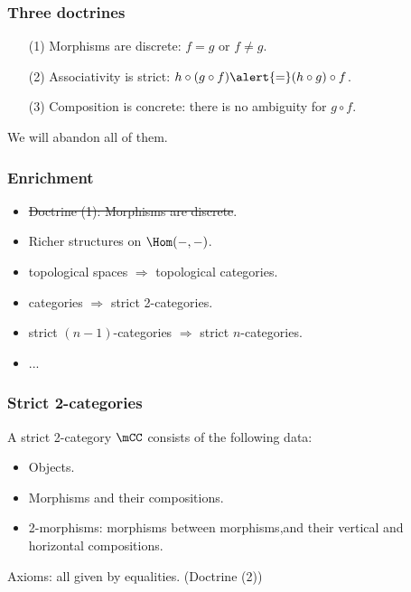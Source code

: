 \begin{frame}
	\frametitle{Three doctrines}

	\begin{itemize}
	\item[(1)]
		Morphisms are \alert{discrete}: $f=g$ or $f\neq g$. \pause
	\item[(2)]
		Associativity is \alert{strict}: $h\circ (g\circ f)\alert{=}(h\circ g) \circ f$. \pause
	\item[(3)]
		Composition is \alert{concrete}: there is no ambiguity for $g\circ f$. \pause
\end{itemize}
	
	We will abandon all of them.

\end{frame}

\begin{frame}
	\frametitle{Enrichment}

	\begin{itemize}
		\item
			\st{Doctrine (1): Morphisms are discrete}. \pause
		\item
			Richer structures on $\Hom(-,-)$.\pause
		\item
			\alert{topological spaces} $\Rightarrow$ \alert{topological categories}. \pause
		\item
			\alert{categories} $\Rightarrow$ \alert{strict 2-categories}. \pause
		\item
			\alert{strict $(n-1)$-categories} $\Rightarrow$ \alert{strict $n$-categories}. \pause
		\item
			...

	\end{itemize}
\end{frame}

\begin{frame}
	\frametitle{Strict 2-categories}

	A strict 2-category $\mCC$ consists of the following data:\pause
	\begin{itemize}
		\item
			Objects. \pause
		\item
			Morphisms and their compositions. \pause
		\item
			\alert{2-morphisms}: morphisms between morphisms,\pause and their \alert{vertical} and \alert{horizontal} compositions. \pause

	\end{itemize}
	Axioms: all given by \alert{equalities}. (Doctrine (2))


\end{frame}

